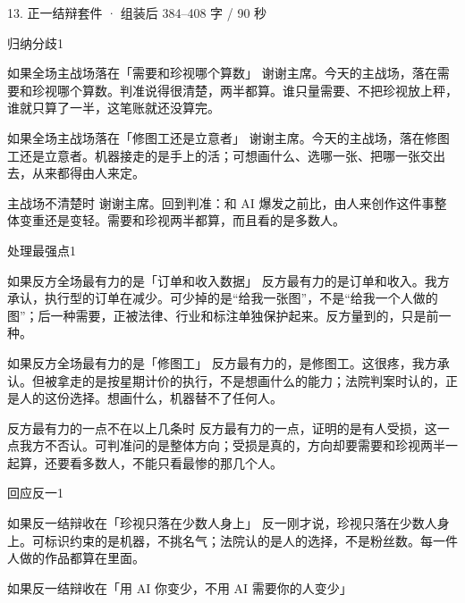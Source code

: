 \documentclass[script,pro]{debate}
\begin{document}
\begin{kit}{13. 正一结辩}{套件 · 组装后 384–408 字 / 90 秒}
\begin{pick}{归纳分歧}{1}
\begin{module}{如果全场主战场落在「需要和珍视哪个算数」}
谢谢主席。今天的主战场，落在需要和珍视哪个算数。判准说得很清楚，两半都算。谁只量需要、不把珍视放上秤，谁就只算了一半，这笔账就还没算完。
\end{module}
\begin{module}{如果全场主战场落在「修图工还是立意者」}
谢谢主席。今天的主战场，落在修图工还是立意者。机器接走的是手上的活；可想画什么、选哪一张、把哪一张交出去，从来都得由人来定。
\end{module}
\begin{fallback}{主战场不清楚时}
谢谢主席。回到判准：和 AI 爆发之前比，由人来创作这件事整体变重还是变轻。需要和珍视两半都算，而且看的是多数人。
\end{fallback}
\end{pick}
\begin{pick}{处理最强点}{1}
\begin{module}{如果反方全场最有力的是「订单和收入数据」}
反方最有力的是订单和收入。我方承认，执行型的订单在减少。可少掉的是“给我一张图”，不是“给我一个人做的图”；后一种需要，正被法律、行业和标注单独保护起来。反方量到的，只是前一种。
\end{module}
\begin{module}{如果反方全场最有力的是「修图工」}
反方最有力的，是修图工。这很疼，我方承认。但被拿走的是按星期计价的执行，不是想画什么的能力；法院判案时认的，正是人的这份选择。想画什么，机器替不了任何人。
\end{module}
\begin{fallback}{反方最有力的一点不在以上几条时}
反方最有力的一点，证明的是有人受损，这一点我方不否认。可判准问的是整体方向；受损是真的，方向却要需要和珍视两半一起算，还要看多数人，不能只看最惨的那几个人。
\end{fallback}
\end{pick}
\begin{pick}{回应反一}{1}
\begin{module}{如果反一结辩收在「珍视只落在少数人身上」}
反一刚才说，珍视只落在少数人身上。可标识约束的是机器，不挑名气；法院认的是人的选择，不是粉丝数。每一件人做的作品都算在里面。
\end{module}
\begin{module}{如果反一结辩收在「用 AI 你变少，不用 AI 需要你的人变少」}

\end{module}
\end{pick}
\end{kit}
\end{document}
